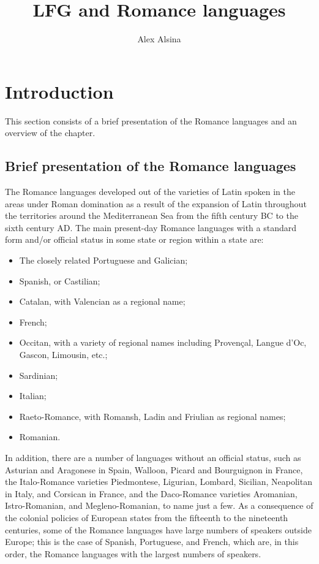 \documentclass[output=paper,hidelinks]{langscibook}
\title{LFG and Romance languages}
\author{Alex Alsina\affiliation{Universitat Pompeu Fabra}}
\begin{document}
\maketitle
\label{chap:Romance}

\section{Introduction}
\label{sec:Romance:1}

This section consists of a brief presentation of the Romance languages and an overview of the chapter.

\subsection{Brief presentation of the Romance languages}
\label{sec:Romance:1.1}

The Romance languages developed out of the varieties of Latin spoken in the areas under Roman domination as a result of the expansion of Latin throughout the territories around the Mediterranean Sea from the fifth century BC to the sixth century AD. The main present-day Romance languages with a standard form and/or official status in some state or region within a state are:

\begin{itemize}
\item 
The closely related Portuguese and Galician;
\item
Spanish, or Castilian;
\item
Catalan, with Valencian as a regional name;
\item
French;
\item
Occitan, with a variety of regional names including Provençal, Langue d'Oc, Gascon, Limousin, etc.;
\item
Sardinian;
\item
Italian;
\item
Raeto-Romance, with Romansh, Ladin and Friulian as regional names;
\item
Romanian.
\end{itemize}
In addition, there are a number of languages without an official status, such as Asturian and Aragonese in Spain, Walloon, Picard and Bourguignon in France, the Italo-Romance varieties Piedmontese, Ligurian, Lombard, Sicilian, Neapolitan in Italy, and Corsican in France, and the Daco-Romance varieties Aromanian, Istro-Romanian, and Megleno-Romanian, to name just a few. As a consequence of the colonial policies of European states from the fifteenth to the nineteenth centuries, some of the Romance languages have large numbers of speakers outside Europe; this is the case of Spanish, Portuguese, and French, which are, in this order, the Romance languages with the largest numbers of speakers.
\end{document}
